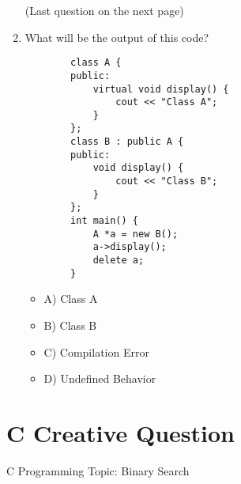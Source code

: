 \documentclass[a4paper,12pt]{article}
\begin{document}
\begin{enumerate}
    \begin{center}
        (Last question on the next page)
    \end{center}

    \newpage

    \item What will be the output of this code?

    \lstset{language=C++}
    \begin{lstlisting}
        class A {
        public:
            virtual void display() {
                cout << "Class A";
            }
        };
        class B : public A {
        public:
            void display() {
                cout << "Class B";
            }
        };
        int main() {
            A *a = new B();
            a->display();
            delete a;
        }
    \end{lstlisting}

    \begin{itemize}
        \item A) Class A
        \item B) Class B
        \item C) Compilation Error
        \item D) Undefined Behavior
    \end{itemize}
\end{enumerate}

\newpage

\section{C Creative Question}

C Programming Topic: Binary Search
\end{document}
